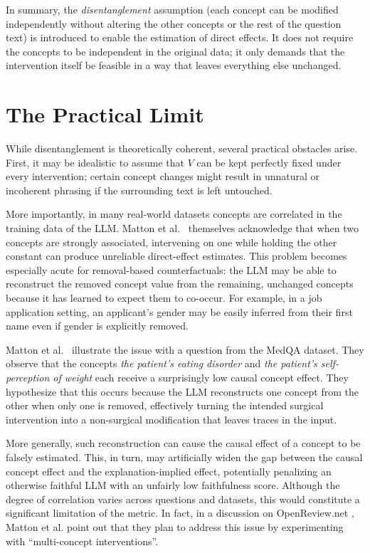 In summary, the \emph{disentanglement} assumption (each concept can be modified independently without altering the other concepts or the rest of the question text) is introduced to enable the estimation of direct effects. It does not require the concepts to be independent in the original data; it only demands that the intervention itself be feasible in a way that leaves everything else unchanged.

\section{The Practical Limit}
\label{sec:pratical_limit}
While disentanglement is theoretically coherent, several practical obstacles arise. First, it may be idealistic to assume that $V$ can be kept perfectly fixed under every intervention; certain concept changes might result in unnatural or incoherent phrasing if the surrounding text is left untouched.

More importantly, in many real-world datasets concepts are correlated in the training data of the LLM. Matton et al.~\cite{mattonWalkTalkMeasuring2024} themselves acknowledge that when two concepts are strongly associated, intervening on one while holding the other constant can produce unreliable direct-effect estimates. This problem becomes especially acute for removal-based counterfactuals: the LLM may be able to reconstruct the removed concept value from the remaining, unchanged concepts because it has learned to expect them to co-occur. For example, in a job application setting, an applicant’s gender may be easily inferred from their first name even if gender is explicitly removed.

Matton et al.~\cite{mattonWalkTalkMeasuring2024} illustrate the issue with a question from the MedQA dataset. They observe that the concepts \textit{the patient’s eating disorder} and \textit{the patient’s self-perception of weight} each receive a surprisingly low causal concept effect. They hypothesize that this occurs because the LLM reconstructs one concept from the other when only one is removed, effectively turning the intended surgical intervention into a non-surgical modification that leaves traces in the input.

More generally, such reconstruction can cause the causal effect of a concept to be falsely estimated. This, in turn, may artificially widen the gap between the causal concept effect and the explanation-implied effect, potentially penalizing an otherwise faithful LLM with an unfairly low faithfulness score. Although the degree of correlation varies across questions and datasets, this would constitute a significant limitation of the metric. In fact, in a discussion on OpenReview.net \cite{matton2025walkthetalk_comment},  Matton et al. point out that they plan to address this issue by experimenting with \enquote{multi-concept interventions}.

